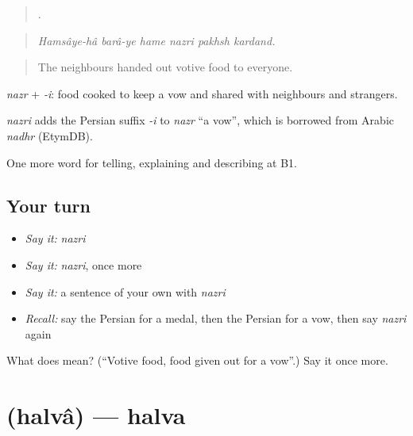 \begin{quote}
      .
\end{quote}

\begin{quote}
\emph{Hamsâye-hâ barâ-ye hame nazri pakhsh kardand.}
\end{quote}

\begin{quote}
The neighbours handed out votive food to everyone.
\end{quote}

\emph{nazr} + \emph{-i}: food cooked to keep a vow and shared with neighbours and strangers.

\begin{cousinweb}
\emph{nazri} adds the Persian suffix \emph{-i} to \emph{nazr} \textquotedblleft{}a vow\textquotedblright{}, which is borrowed from Arabic \emph{nadhr} (EtymDB).
\end{cousinweb}

\begin{grammarlens}[title={What you've built}]
One more word for telling, explaining and describing at B1.
\end{grammarlens}

\subsection*{Your turn}
\begin{itemize}
\raggedright
  \item \emph{Say it:} \emph{nazri}
  \item \emph{Say it:} \emph{nazri}, once more
  \item \emph{Say it:} a sentence of your own with \emph{nazri}
  \item \emph{Recall:} say the Persian for a medal, then the Persian for a vow, then say \emph{nazri} again
\end{itemize}

\begin{tcolorbox}[breakable,colback=teal!4,colframe=teal!35!black,title={Before you move on}]
What does  mean? (\textquotedblleft{}Votive food, food given out for a vow\textquotedblright{}.) Say it once more.
\end{tcolorbox}
\section[\texorpdfstring{\fa{حلوا} (halvâ)}{حلوا (halvâ)}]{ (halvâ) — halva}

